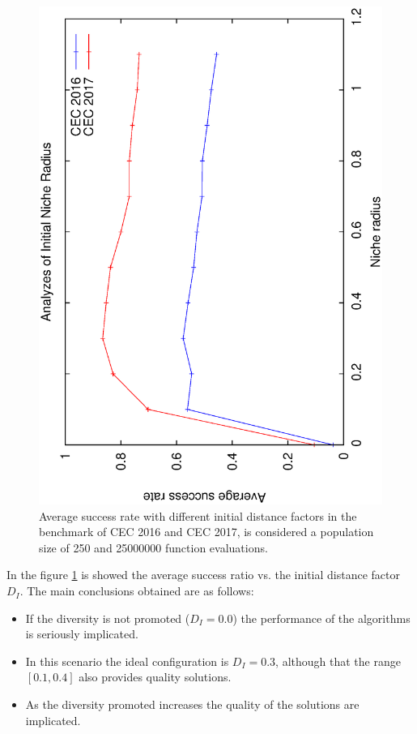 \begin{figure}[t]
\centering
  \includegraphics[scale=0.3, angle=-90]{img/Tuning_CEC.eps}
\caption{Average success rate with different initial distance factors in the benchmark of CEC 2016 and CEC 2017, is considered a population size of 250 and 25000000 function evaluations.}
\label{fig:one}
\end{figure}

In the figure \ref{fig:one} is showed the average success ratio vs. the initial distance factor $D_I$.
%
The main conclusions obtained are as follows:
\begin{itemize}
\item If the diversity is not promoted ($D_I = 0.0 $) the performance of the algorithms is seriously implicated.
\item In this scenario the ideal configuration is $D_I=0.3$, although that the range $[0.1, 0.4]$ also provides quality solutions.
\item As the diversity promoted increases the quality of the solutions are implicated.
\end{itemize}


